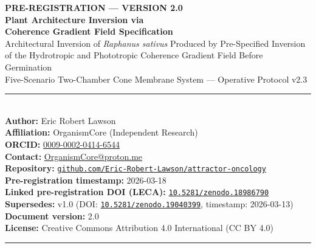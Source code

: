 \documentclass[10pt, a4paper]{article}
\begin{document}
\begin{center}
  {\LARGE\bfseries\color{headergreen}
  PRE-REGISTRATION --- VERSION 2.0}\\[0.4em]
  {\Large\bfseries
  Plant Architecture Inversion via\\
  Coherence Gradient Field Specification}\\[0.5em]
  {\large
  Architectural Inversion of \textit{Raphanus sativus}
  Produced by Pre-Specified Inversion\\
  of the Hydrotropic and Phototropic
  Coherence Gradient Field Before Germination\\
  Five-Scenario Two-Chamber Cone Membrane System ---
  Operative Protocol v2.3}\\[0.6em]
  \noindent\textcolor{rulecolor}{\rule{\linewidth}{1pt}}\\[0.4em]
  {\normalsize
  \textbf{Author:} Eric Robert Lawson\\
  \textbf{Affiliation:} OrganismCore (Independent Research)\\
  \textbf{ORCID:}
  \href{https://orcid.org/0009-0002-0414-6544}
  {0009-0002-0414-6544}\\
  \textbf{Contact:}
  \href{mailto:OrganismCore@proton.me}
  {OrganismCore@proton.me}\\
  \textbf{Repository:}
  \href{https://github.com/Eric-Robert-Lawson/attractor-oncology}
  {\texttt{github.com/Eric-Robert-Lawson/attractor-oncology}}\\
  \textbf{Pre-registration timestamp:} 2026-03-18\\
  \textbf{Linked pre-registration DOI (LECA):}
  \href{https://doi.org/10.5281/zenodo.18986790}
  {\texttt{10.5281/zenodo.18986790}}\\
  \textbf{Supersedes:} v1.0
  (DOI: \href{https://doi.org/10.5281/zenodo.19040399}
  {\texttt{10.5281/zenodo.19040399}},
  timestamp: 2026-03-13)\\
  \textbf{Document version:} 2.0\\
  \textbf{License:}
  Creative Commons Attribution 4.0 International (CC BY 4.0)}\\[0.4em]
  \noindent\textcolor{rulecolor}{\rule{\linewidth}{1pt}}
\end{center}

\vspace{0.3em}
\end{document}
